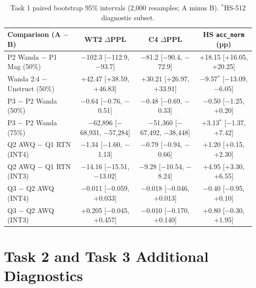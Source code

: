 \documentclass{article}
\begin{document}
\begin{table}[H]
\centering\footnotesize
\caption{Task 1 paired bootstrap 95\% intervals (2,000 resamples; A minus B). $^*$HS-512 diagnostic subset.}
\label{tab:t1ci}
\begin{tabular}{lccc}
\toprule
Comparison (A $-$ B) & WT2 $\Delta$PPL & C4 $\Delta$PPL & HS \texttt{acc\_norm} (pp) \\
\midrule
P2 Wanda $-$ P1 Mag (50\%) & $-$102.3 [$-$112.9, $-$93.7] & $-$81.2 [$-$90.4, $-$72.9] & +18.15 [+16.05, +20.25] \\
Wanda 2:4 $-$ Unstruct (50\%) & +42.47 [+38.59, +46.83] & +30.21 [+26.97, +33.91] & $-$9.57$^*$ [$-$13.09, $-$6.05] \\
P3 $-$ P2 Wanda (50\%) & $-$0.64 [$-$0.76, $-$0.51] & $-$0.48 [$-$0.69, $-$0.33] & $-$0.50 [$-$1.25, +0.20] \\
P3 $-$ P2 Wanda (75\%) & $-$62,896 [$-$68,931, $-$57,284] & $-$51,360 [$-$67,492, $-$38,448] & +3.13$^*$ [$-$1.37, +7.42] \\
Q2 AWQ $-$ Q1 RTN (INT4) & $-$1.34 [$-$1.60, $-$1.13] & $-$0.79 [$-$0.94, $-$0.66] & +1.20 [+0.15, +2.30] \\
Q2 AWQ $-$ Q1 RTN (INT3) & $-$14.16 [$-$15.51, $-$13.02] & $-$9.28 [$-$10.54, $-$8.24] & +4.95 [+3.30, +6.55] \\
Q3 $-$ Q2 AWQ (INT4) & $-$0.011 [$-$0.059, +0.033] & $-$0.018 [$-$0.046, +0.013] & $-$0.40 [$-$0.95, +0.10] \\
Q3 $-$ Q2 AWQ (INT3) & +0.205 [$-$0.045, +0.457] & $-$0.010 [$-$0.170, +0.140] & +0.80 [$-$0.30, +1.95] \\
\bottomrule
\end{tabular}
\end{table}

\section{Task 2 and Task 3 Additional Diagnostics}
\label{app:t2}
\end{document}
